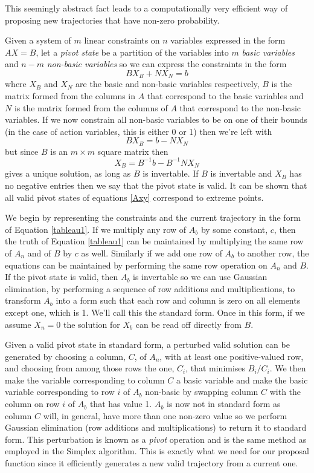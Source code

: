 \documentclass{article}
\begin{document}
This seemingly abstract fact leads to a computationally very efficient way of proposing new trajectories that have non-zero probability.


Given a system of $m$ linear constraints on $n$ variables expressed in the form $AX=B$, let a \textit{pivot state} be a partition of the variables into $m$ \textit{basic variables} and $n-m$ \textit{non-basic variables} so we can express the constraints in the form
\begin{equation}
BX_B + NX_N = b
\label{tableau1}
\end{equation}
where $X_B$ and $X_N$ are the basic and non-basic variables respectively, $B$ is the matrix formed from the columns in $A$ that correspond to the basic variables and $N$ is the matrix formed from the columns of $A$ that correspond to the non-basic variables. If we now constrain all non-basic variables to be on one of their bounds (in the case of action variables, this is either 0 or 1) then we're left with
\[
BX_B = b - NX_N
\]
but since $B$ is an $m \times m$ square matrix then 
\[
X_B = B^{-1}b - B^{-1}NX_N
\]
gives a unique solution, as long as $B$ is invertable. If $B$ is invertable and $X_B$ has no negative entries then we say that the pivot state is valid. It can be shown that all valid pivot states of equations \eqref{Axy} correspond to extreme points\cite{dantzig1955generalized}.

We begin by representing the constraints and the current trajectory in the form of Equation \eqref{tableau1}. If we multiply any row of $A_b$ by some constant, $c$, then the truth of Equation \eqref{tableau1} can be maintained by multiplying the same row of $A_n$ and of $B$ by $c$ as well. Similarly if we add one row of $A_b$ to another row, the equations can be maintained by performing the same row operation on $A_n$ and $B$. If the pivot state is valid, then $A_b$ is invertable so we can use Gaussian elimination, by performing a sequence of row additions and multiplications, to transform $A_b$ into a form such that each row and column is zero on all elements except one, which is 1. We'll call this the standard form. Once in this form, if we assume $X_n = 0$ the solution for $X_b$ can be read off directly from $B$.

Given a valid pivot state in standard form, a perturbed valid solution can be generated by choosing a column, $C$, of $A_n$, with at least one positive-valued row, and choosing from among those rows the one, $C_i$, that minimises $B_i/C_i$. We then make the variable corresponding to column $C$ a basic variable and make the basic variable corresponding to row $i$ of $A_b$ non-basic by swapping column $C$ with the column on row $i$ of $A_b$ that has value 1. $A_b$ is now not in standard form as column $C$ will, in general, have more than one non-zero value so we perform Gaussian elimination (row additions and multiplications) to return it to standard form. This perturbation is known as a \textit{pivot} operation and is the same method as employed in the Simplex algorithm\cite{dantzig1955generalized}\cite{vanderbei2015linear}. This is exactly what we need for our proposal function since it efficiently generates a new valid trajectory from a current one.
\end{document}
